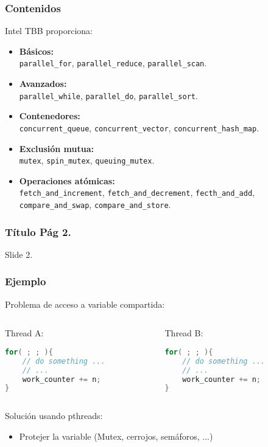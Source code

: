\documentclass[10pt]{beamer}
\begin{document}
\begin{frame}
  \frametitle{Contenidos}
  Intel TBB proporciona:
  \begin{itemize}
  \item \textbf{Básicos:}\\\quad\texttt{parallel\_for}, \texttt{parallel\_reduce},
    \texttt{parallel\_scan}.
  \item \textbf{Avanzados:}\\\quad\texttt{parallel\_while}, \texttt{parallel\_do},
    \texttt{parallel\_sort}.
  \item \textbf{Contenedores:}\\\quad\texttt{concurrent\_queue},
    \texttt{concurrent\_vector}, \texttt{concurrent\_hash\_map}.
  \item \textbf{Exclusión mutua:}\\\quad\texttt{mutex},
    \texttt{spin\_mutex}, \texttt{queuing\_mutex}.
  \item \textbf{Operaciones atómicas:}\\\quad
    \texttt{fetch\_and\_increment}, \texttt{fetch\_and\_decrement},
    \texttt{fecth\_and\_add}, \texttt{compare\_and\_swap},
    \texttt{compare\_and\_store}.
  \end{itemize}

\end{frame}



\begin{frame}
  \frametitle{Título Pág 2.}
  Slide 2.
\end{frame}


\begin{frame}[fragile] %
  \frametitle{Ejemplo}
  \alert{Problema} de acceso a variable compartida:
  \begin{columns}
    \begin{column}{0.45\textwidth}
      \center Thread A:
      \begin{lstlisting}[language=C++, frame=single]
for( ; ; ){
    // do something ...
    // ...
    work_counter += n;
}
      \end{lstlisting}
    \end{column}
    \begin{column}{0.45\textwidth}
      \center Thread B:
      \begin{lstlisting}[language=C++, frame=single]
for( ; ; ){
    // do something ...
    // ...
    work_counter += n;
}
      \end{lstlisting}
    \end{column}
  \end{columns}
  \alert{Solución} usando pthreads:
  \begin{itemize}
  \item Protejer la variable (Mutex, cerrojos, semáforos, ...)
  \end{itemize}
\end{frame}
\end{document}

